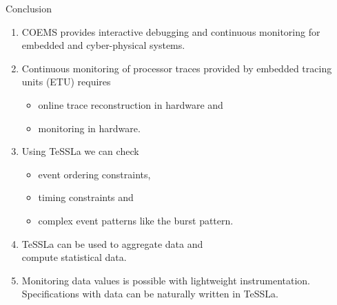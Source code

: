 \begin{frame}{Conclusion}
  \begin{enumerate}
    \item \alert{COEMS} provides \alert{interactive} debugging and \alert{continuous monitoring} for \alert{embedded and cyber-physical systems}.
    \item \alert{Continuous monitoring} of processor traces provided by \alert{embedded tracing units (ETU)} requires
      \begin{itemize}
        \item \alert{online trace reconstruction} in hardware and
        \item \alert{monitoring in hardware}.
      \end{itemize}
    \item Using \alert{TeSSLa} we can check
      \begin{itemize}
        \item \alert{event ordering} constraints,
        \item \alert{timing} constraints and
        \item \alert{complex event patterns} like the burst pattern.
      \end{itemize}
    \item TeSSLa can be used to \alert{aggregate data} and\\ compute \alert{statistical data}.
    \item Monitoring \alert{data values} is possible with \alert{lightweight instrumentation}.
      Specifications with data can be naturally written in TeSSLa.
  \end{enumerate}
\end{frame}